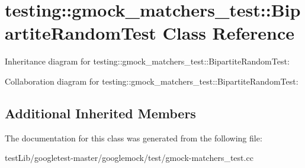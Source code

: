 \hypertarget{classtesting_1_1gmock__matchers__test_1_1BipartiteRandomTest}{}\section{testing\+:\+:gmock\+\_\+matchers\+\_\+test\+:\+:Bipartite\+Random\+Test Class Reference}
\label{classtesting_1_1gmock__matchers__test_1_1BipartiteRandomTest}


Inheritance diagram for testing\+:\+:gmock\+\_\+matchers\+\_\+test\+:\+:Bipartite\+Random\+Test\+:


Collaboration diagram for testing\+:\+:gmock\+\_\+matchers\+\_\+test\+:\+:Bipartite\+Random\+Test\+:
\subsection*{Additional Inherited Members}


The documentation for this class was generated from the following file\+:\begin{DoxyCompactItemize}
\item 
test\+Lib/googletest-\/master/googlemock/test/gmock-\/matchers\+\_\+test.\+cc\end{DoxyCompactItemize}
